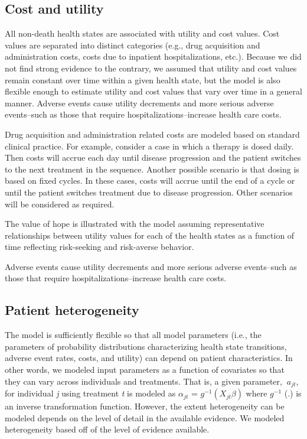 \documentclass[11pt,final,fleqn]{article}\usepackage[]{graphicx}\usepackage[]{color}
\theoremstyle{plain}
\begin{document}
{\subsection{Cost and utility}
All non-death health states are associated with utility and cost values. Cost values are separated into distinct categories (e.g., drug acquisition and administration costs, costs due to inpatient hospitalizations, etc.). Because we did not find strong evidence to the contrary, we assumed that utility and cost values remain constant over time within a given health state, but the model is also flexible enough to estimate utility and cost values that vary over time in a general manner. Adverse events cause utility decrements and more serious adverse events--such as those that require hospitalizations--increase health care costs. 

Drug acquisition and administration related costs are modeled based on standard clinical practice. For example, consider a case in which a therapy is dosed daily. Then costs will accrue each day until disease progression and the patient switches to the next treatment in the sequence. Another possible scenario is that dosing is based on fixed cycles. In these cases, costs will accrue until the end of a cycle or until the patient switches treatment due to disease progression. Other scenarios will be considered as required. 

The value of hope is illustrated with the model assuming representative relationships between utility values for each of the health states as a function of time reflecting risk-seeking and risk-averse behavior. 

Adverse events cause utility decrements and more serious adverse events--such as those that require hospitalizations--increase health care costs. 

\subsection{Patient heterogeneity}
The model is sufficiently flexible so that all model parameters (i.e., the parameters of probability distributions characterizing health state transitions, adverse event rates, costs, and utility) can depend on patient characteristics. In other words, we modeled input parameters as a function of covariates so that they can vary across individuals and treatments. That is, a given parameter, $\ a_{jt} $, for individual \textit{j} using treatment \textit{t} is modeled as $ \alpha_{jt} $ = $ \textit{g}^{-1} (X_{jt}\beta) $ where $ \textit{g}^{-1} $ (.) is an inverse transformation function. However, the extent heterogeneity can be modeled depends on the level of detail in the available evidence. We modeled heterogeneity based off of the level of evidence available. 

}
\end{document}

